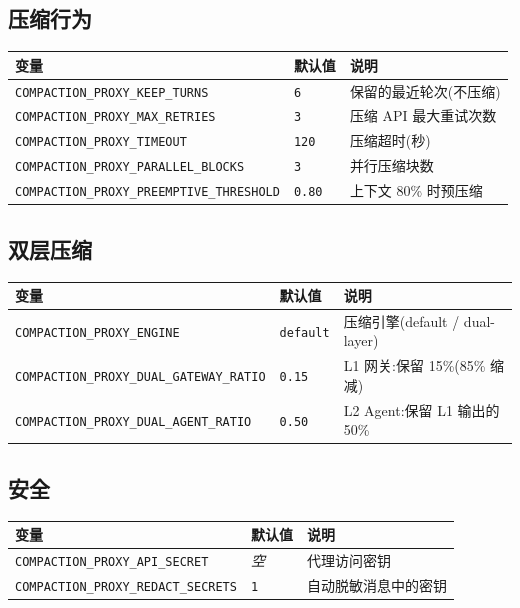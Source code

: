 \documentclass[11pt,a4paper]{article}
\begin{document}
\subsection{压缩行为}

\begin{longtable}{@{}llp{7cm}@{}}
  \toprule
  变量 & 默认值 & 说明 \\
  \midrule
  \texttt{COMPACTION\_PROXY\_KEEP\_TURNS} & \texttt{6} & 保留的最近轮次(不压缩) \\
  \texttt{COMPACTION\_PROXY\_MAX\_RETRIES} & \texttt{3} & 压缩 API 最大重试次数 \\
  \texttt{COMPACTION\_PROXY\_TIMEOUT} & \texttt{120} & 压缩超时(秒) \\
  \texttt{COMPACTION\_PROXY\_PARALLEL\_BLOCKS} & \texttt{3} & 并行压缩块数 \\
  \texttt{COMPACTION\_PROXY\_PREEMPTIVE\_THRESHOLD} & \texttt{0.80} & 上下文 80\% 时预压缩 \\
  \bottomrule
\end{longtable}

\subsection{双层压缩}

\begin{longtable}{@{}llp{7cm}@{}}
  \toprule
  变量 & 默认值 & 说明 \\
  \midrule
  \texttt{COMPACTION\_PROXY\_ENGINE} & \texttt{default} & 压缩引擎(default / dual-layer) \\
  \texttt{COMPACTION\_PROXY\_DUAL\_GATEWAY\_RATIO} & \texttt{0.15} & L1 网关:保留 15\%(85\% 缩减) \\
  \texttt{COMPACTION\_PROXY\_DUAL\_AGENT\_RATIO} & \texttt{0.50} & L2 Agent:保留 L1 输出的 50\% \\
  \bottomrule
\end{longtable}

\subsection{安全}

\begin{longtable}{@{}llp{7cm}@{}}
  \toprule
  变量 & 默认值 & 说明 \\
  \midrule
  \texttt{COMPACTION\_PROXY\_API\_SECRET} & \textit{空} & 代理访问密钥 \\
  \texttt{COMPACTION\_PROXY\_REDACT\_SECRETS} & \texttt{1} & 自动脱敏消息中的密钥 \\
  \bottomrule
\end{longtable}
\end{document}
